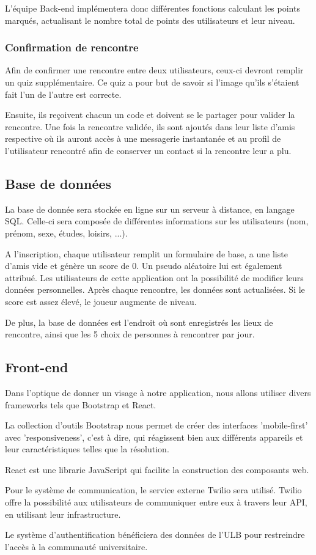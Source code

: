 \documentclass[10pt]{article}
\begin{document}
    L'équipe Back-end implémentera donc différentes fonctions calculant les points marqués, actualisant le nombre total de points des
    utilisateurs et leur niveau.
   \subsubsection{Confirmation de rencontre}
    Afin de confirmer une rencontre entre deux utilisateurs, ceux-ci devront remplir un quiz supplémentaire. 
    Ce quiz a pour but de savoir si l'image qu'ils s'étaient fait l'un de l'autre est correcte. 

    Ensuite, ils reçoivent chacun un code et doivent se le partager pour valider la rencontre. 
    Une fois la rencontre validée, ils sont ajoutés dans leur liste d'amis respective où ils auront accès à une messagerie 
    instantanée et au profil de l'utilisateur rencontré afin de conserver un contact si la rencontre leur a plu. 
    
  \subsection{Base de données}
   La base de donnée sera stockée en ligne sur un serveur à distance, en langage SQL. 
   Celle-ci sera composée de différentes informations sur les utilisateurs (nom, prénom, sexe, études, loisirs, ...).
   
   A l'inscription, chaque utilisateur remplit un formulaire de base, a une liste d'amis vide et génère un score de 0.
   Un pseudo aléatoire lui est également attribué. Les utilisateurs de cette application ont la possibilité de modifier leurs données personnelles.
   Après chaque rencontre, les données sont actualisées. Si le score est assez élevé, le joueur augmente de niveau.

   De plus, la base de données est l'endroit où sont enregistrés les lieux de rencontre, ainsi que les 5 choix de personnes à rencontrer par jour.
   
  \subsection{Front-end}
   Dans l'optique de donner un visage à notre application, nous allons utiliser divers frameworks tels que Bootstrap et React.

   La collection d'outils Bootstrap nous permet de créer des interfaces 'mobile-first' avec 'responsiveness', c'est à dire, qui réagissent bien
   aux différents appareils et leur caractéristiques telles que la résolution.

   React est une librarie JavaScript qui facilite la construction des composants web.

   Pour le système de communication, le service externe Twilio sera utilisé. Twilio offre la possibilité aux utilisateurs de communiquer
   entre eux à travers leur API, en utilisant leur infrastructure.

   Le système d'authentification bénéficiera des données de l'ULB pour restreindre l'accès à la communauté universitaire. 
\end{document}
